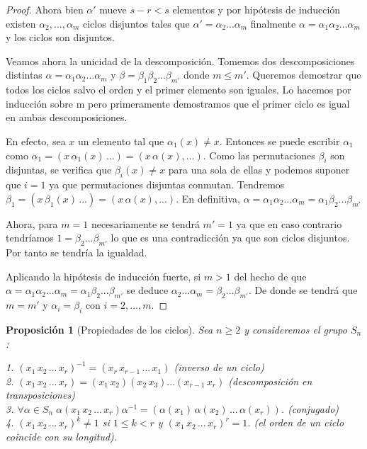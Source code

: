 \documentclass{article}
\theoremstyle{theorem-style}  %
\newtheorem{proposition}[theorem]{Proposición}
\theoremstyle{definition-style}
\theoremstyle{example-style}
\begin{document}
\begin{proof}
Ahora bien $\alpha'$ mueve $s-r < s$ elementos y por hipótesis de inducción existen $\alpha_2,...,\alpha_m$ ciclos disjuntos tales que $\alpha' = \alpha_2...\alpha_m$ finalmente $\alpha = \alpha_1\alpha_2...\alpha_m$ y los ciclos son disjuntos.

Veamos ahora la unicidad de la descomposición. Tomemos dos descomposiciones distintas $\alpha = \alpha_1\alpha_2...\alpha_m$ y $\beta = \beta_1\beta_2...\beta_{m'}$ donde $m \le m'$. Queremos demostrar que todos los ciclos salvo el orden y el primer elemento son iguales. Lo hacemos por inducción sobre m pero primeramente demostramos que el primer ciclo es igual en ambas descomposiciones.

En efecto, sea $x$ un elemento tal que $\alpha_1(x) \neq x$. Entonces se puede escribir $\alpha_1$ como $\alpha_1 = (x \, \alpha_1(x) \, ...) = (x \, \alpha(x),...)$. Como las permutaciones $\beta_i$ son disjuntas, se verifica que $\beta_i(x) \neq x$ para una sola de ellas y podemos suponer que $i = 1$ ya que permutaciones disjuntas conmutan. Tendremos $\beta_1 = (x \, \beta_1(x) \, ...) = (x \, \alpha(x),...)$. En definitiva, $\alpha = \alpha_1\alpha_2...\alpha_m = \alpha_1\beta_2...\beta_{m'}$

Ahora, para $m = 1$ necesariamente se tendrá $m' = 1$ ya que en caso contrario tendríamos $1 = \beta_2...\beta_{m'}$ lo que es una contradicción ya que son ciclos disjuntos. Por tanto se tendría la igualdad. 

Aplicando la hipótesis de inducción fuerte, si $m > 1$ del hecho de que $\alpha = \alpha_1\alpha_2...\alpha_m = \alpha_1\beta_2...\beta_{m'}$ se deduce $\alpha_2...\alpha_m = \beta_2...\beta_{m'}$. De donde se tendrá que $m = m'$ y $\alpha_i = \beta_i$ con $i=2,...,m$.
\end{proof}

\begin{proposition}[Propiedades de los ciclos]\label{proposition:propiedades-ciclos}
Sea $n \ge 2$ y consideremos el grupo $S_n$:

1. $(x_1 \, x_2 \, ... \, x_r)^{-1} = (x_r \, x_{r-1} \, ... \, x_1)$ (inverso de un ciclo)\\
2. $(x_1 \, x_2 \, ... \, x_r) = (x_1 \, x_2)(x_2 \, x_3)...(x_{r-1} \, x_r)$ (descomposición en transposiciones)\\
3. $\forall \alpha \in S_n \; \alpha (x_1 \, x_2 \, ... \, x_r) \alpha^{-1} = (\alpha(x_1) \, \alpha(x_2) \, ... \, \alpha(x_r))$. (conjugado)\\
4. $(x_1 \, x_2 \, ... \, x_r)^k \neq 1$ si $1 \le k < r$ y $(x_1 \, x_2 \, ... \, x_r)^r = 1$. (el orden de un ciclo coincide con su longitud).
\end{proposition}
\end{document}
